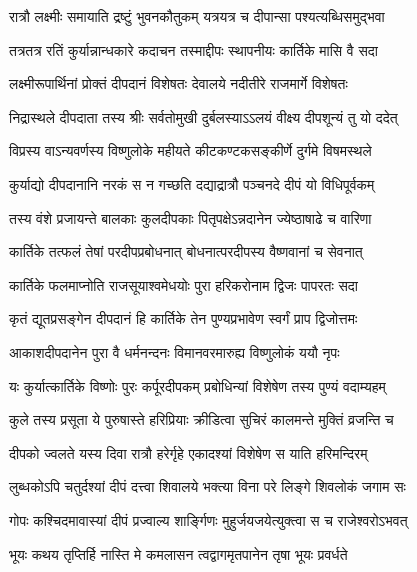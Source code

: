 \twolineshloka
{रात्रौ लक्ष्मीः समायाति द्रष्टुं भुवनकौतुकम्}
{यत्रयत्र च दीपान्सा पश्यत्यब्धिसमुद्भवा} %

\twolineshloka
{तत्रतत्र रतिं कुर्यान्नान्धकारे कदाचन}
{तस्माद्दीपः स्थापनीयः कार्तिके मासि वै सदा} %

\twolineshloka
{लक्ष्मीरूपार्थिनां प्रोक्तं दीपदानं विशेषतः}
{देवालये नदीतीरे राजमार्गे विशेषतः} %

\twolineshloka
{निद्रास्थले दीपदाता तस्य श्रीः सर्वतोमुखी}
{दुर्बलस्याऽऽलयं वीक्ष्य दीपशून्यं तु यो ददेत्} %

\twolineshloka
{विप्रस्य वाऽन्यवर्णस्य विष्णुलोके महीयते}
{कीटकण्टकसङ्कीर्णे दुर्गमे विषमस्थले} %

\twolineshloka
{कुर्याद्यो दीपदानानि नरकं स न गच्छति}
{दद्याद्रात्रौ पञ्चनदे दीपं यो विधिपूर्वकम्} %

\twolineshloka
{तस्य वंशे प्रजायन्ते बालकाः कुलदीपकाः}
{पितृपक्षेऽन्नदानेन ज्येष्ठाषाढे च वारिणा} %

\twolineshloka
{कार्तिके तत्फलं तेषां परदीपप्रबोधनात्}
{बोधनात्परदीपस्य वैष्णवानां च सेवनात्} %

\twolineshloka
{कार्तिके फलमाप्नोति राजसूयाश्वमेधयोः}
{पुरा हरिकरोनाम द्विजः पापरतः सदा} %

\twolineshloka
{कृतं द्यूतप्रसङ्गेन दीपदानं हि कार्तिके}
{तेन पुण्यप्रभावेण स्वर्गं प्राप द्विजोत्तमः} %

\twolineshloka
{आकाशदीपदानेन पुरा वै धर्मनन्दनः}
{विमानवरमारुह्य विष्णुलोकं ययौ नृपः} %

\twolineshloka
{यः कुर्यात्कार्तिके विष्णोः पुरः कर्पूरदीपकम्}
{प्रबोधिन्यां विशेषेण तस्य पुण्यं वदाम्यहम्} %

\twolineshloka
{कुले तस्य प्रसूता ये पुरुषास्ते हरिप्रियाः}
{क्रीडित्वा सुचिरं कालमन्ते मुक्तिं व्रजन्ति च} %

\twolineshloka
{दीपको ज्वलते यस्य दिवा रात्रौ हरेर्गृहे}
{एकादश्यां विशेषेण स याति हरिमन्दिरम्} %

\twolineshloka
{लुब्धकोऽपि चतुर्दश्यां दीपं दत्त्वा शिवालये}
{भक्त्या विना परे लिङ्गे शिवलोकं जगाम सः} %

\twolineshloka
{गोपः कश्चिदमावास्यां दीपं प्रज्वाल्य शार्ङ्गिणः}
{मुहुर्जयजयेत्युक्त्वा स च राजेश्वरोऽभवत्} %





\twolineshloka
{भूयः कथय तृप्तिर्हि नास्ति मे कमलासन}
{त्वद्वागमृतपानेन तृषा भूयः प्रवर्धते} %


